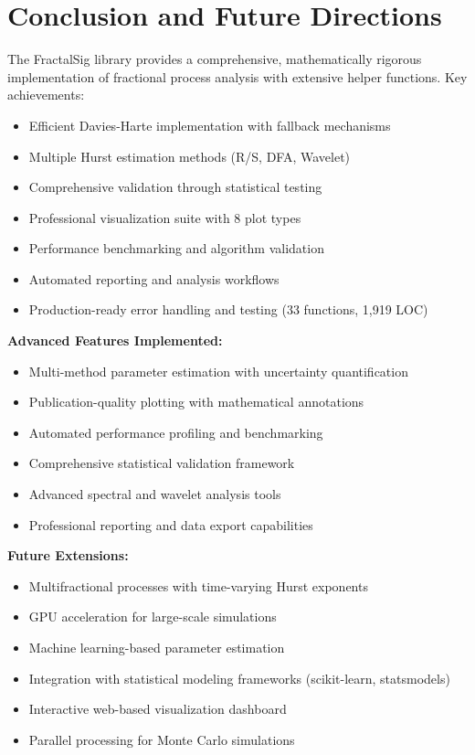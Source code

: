\documentclass[11pt,a4paper]{article}
\begin{document}
\section{Conclusion and Future Directions}

The FractalSig library provides a comprehensive, mathematically rigorous implementation of fractional process analysis with extensive helper functions. Key achievements:

\begin{itemize}
    \item Efficient Davies-Harte implementation with fallback mechanisms
    \item Multiple Hurst estimation methods (R/S, DFA, Wavelet)
    \item Comprehensive validation through statistical testing
    \item Professional visualization suite with 8 plot types
    \item Performance benchmarking and algorithm validation
    \item Automated reporting and analysis workflows
    \item Production-ready error handling and testing (33 functions, 1,919 LOC)
\end{itemize}

\textbf{Advanced Features Implemented:}
\begin{itemize}
    \item Multi-method parameter estimation with uncertainty quantification
    \item Publication-quality plotting with mathematical annotations
    \item Automated performance profiling and benchmarking
    \item Comprehensive statistical validation framework
    \item Advanced spectral and wavelet analysis tools
    \item Professional reporting and data export capabilities
\end{itemize}

\textbf{Future Extensions:}
\begin{itemize}
    \item Multifractional processes with time-varying Hurst exponents
    \item GPU acceleration for large-scale simulations
    \item Machine learning-based parameter estimation
    \item Integration with statistical modeling frameworks (scikit-learn, statsmodels)
    \item Interactive web-based visualization dashboard
    \item Parallel processing for Monte Carlo simulations
\end{itemize}
\end{document}
